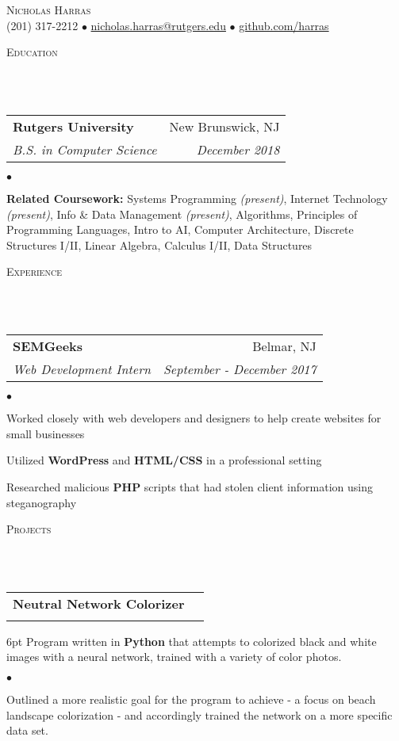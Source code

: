 \documentclass[12pt]{article}
\makeatletter
\newcommand{\lineunder}{
	\vspace*{-8pt} \\ 
	\hspace*{-18pt} 
	\hrulefill \\
}
\newcommand{\header}[1]{
	\vspace*{2pt}
	{\hspace*{-14pt}\vspace*{6pt} \textsc{#1}} 
	\vspace*{-6pt} 
	\lineunder
}
\newcommand{\contact}[2]{
	\vspace*{-8pt}
	\begin{center}
		{\LARGE \scshape {#1}}\\
		#2
	\end{center}
	\vspace*{-8pt}
}
\newenvironment{achievements}{
  \begin{list}{$\bullet$}{
  	\topsep 0pt \itemsep -4pt}}
  	{\vspace*{2pt}\end{list}
}
\newcommand{\mailto}[1]{
	\href{mailto:#1}{#1}}
\newcommand{\subheading}[4]{
 	\vspace{5pt}
    	\begin{tabular*}{1.01\textwidth}{l@{\extracolsep{\fill}}r}
      		\textbf{#1} & #2 \\
      		\textit{\small#3} & \textit{\small #4} \\
    	\end{tabular*}\vspace{-5pt}
}
\makeatother
\begin{document}
\small
\smallskip
\vspace*{-44pt}

\contact{Nicholas Harras}{(201) 317-2212 $\bullet$ \mailto{nicholas.harras@rutgers.edu} $\bullet$ \href{https://www.github.com/harras}{github.com/harras}}

\header{Education}

\subheading
	{Rutgers University}{New Brunswick, NJ}
	{B.S. in Computer Science}{December 2018}
	\begin{achievements}	
	\item{\bf Related Coursework:} Systems Programming \textit{(present)}, Internet Technology \textit{(present)},  Info \& Data Management \textit{(present)}, Algorithms, Principles of Programming Languages, Intro to AI, Computer Architecture, Discrete Structures I/II, Linear Algebra, Calculus I/II, Data Structures
	\end{achievements}

\header{Experience}

\subheading
	{SEMGeeks}{Belmar, NJ}
	{Web Development Intern}{September - December 2017}
	\begin{achievements}
		\item Worked closely with web developers and designers to help create websites for small businesses
		\item Utilized \textbf{WordPress} and \textbf{HTML/CSS} in a professional setting
		\item Researched malicious \textbf{PHP} scripts that had stolen client information using steganography
	\end{achievements}


\header{Projects}

\subheading{Neutral Network Colorizer}{}{}{}
	\vspace{-15pt}
	\begin{adjustwidth}{6pt}{}
	Program written in \textbf{Python} that attempts to colorized black and white images with a neural network, trained with a variety of color photos.
	\end{adjustwidth}
	\begin{achievements}
		\item Outlined a more realistic goal for the program to achieve - a focus on beach landscape colorization - and accordingly trained the network on a more specific data set. 
	\end{achievements}
	
\end{document}
